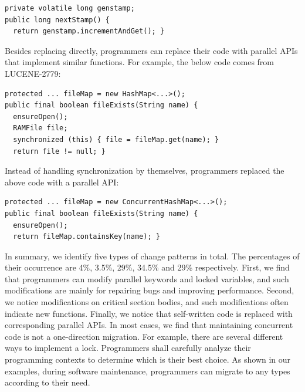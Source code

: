 

\begin{lstlisting}
private volatile long genstamp;
public long nextStamp() {
  return genstamp.incrementAndGet(); }
\end{lstlisting}

Besides replacing directly, programmers can replace their code with parallel APIs that implement similar functions. For example, the below code comes from LUCENE-2779:

\begin{lstlisting}
protected ... fileMap = new HashMap<...>();
public final boolean fileExists(String name) {
  ensureOpen();
  RAMFile file;
  synchronized (this) { file = fileMap.get(name); }
  return file != null; }
\end{lstlisting}

Instead of handling synchronization by themselves, programmers replaced the above code with a parallel API:

\begin{lstlisting}
protected ... fileMap = new ConcurrentHashMap<...>();
public final boolean fileExists(String name) {
  ensureOpen();
  return fileMap.containsKey(name); }
\end{lstlisting}

%
%
%
%
%
%

In summary, we identify five types of change patterns in total. The percentages of their occurrence are 4\%, 3.5\%, 29\%, 34.5\% and 29\% respectively. First, we find that programmers can modify parallel keywords and locked variables, and such modifications are mainly for repairing bugs and improving performance. Second, we notice modifications on critical section bodies, and such modifications often indicate new functions. Finally, we notice that self-written code is replaced with corresponding parallel APIs. In most cases, we find that maintaining concurrent code is not a one-direction migration. For example, there are several different ways to implement a lock. Programmers shall carefully analyze their programming contexts to determine which is their best choice. As shown in our examples, during software maintenance, programmers can migrate to any types according to their need.

